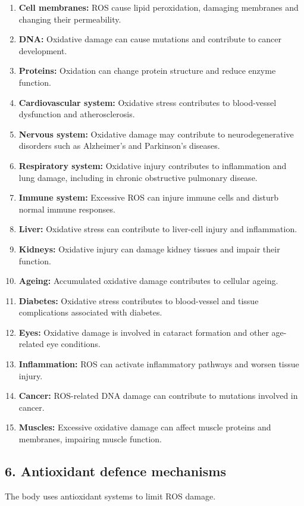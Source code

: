 \documentclass[11pt]{article}
\begin{document}
\begin{enumerate}
    \item \textbf{Cell membranes:} ROS cause lipid peroxidation, damaging membranes and changing their permeability.
    \item \textbf{DNA:} Oxidative damage can cause mutations and contribute to cancer development.
    \item \textbf{Proteins:} Oxidation can change protein structure and reduce enzyme function.
    \item \textbf{Cardiovascular system:} Oxidative stress contributes to blood-vessel dysfunction and atherosclerosis.
    \item \textbf{Nervous system:} Oxidative damage may contribute to neurodegenerative disorders such as Alzheimer's and Parkinson's diseases.
    \item \textbf{Respiratory system:} Oxidative injury contributes to inflammation and lung damage, including in chronic obstructive pulmonary disease.
    \item \textbf{Immune system:} Excessive ROS can injure immune cells and disturb normal immune responses.
    \item \textbf{Liver:} Oxidative stress can contribute to liver-cell injury and inflammation.
    \item \textbf{Kidneys:} Oxidative injury can damage kidney tissues and impair their function.
    \item \textbf{Ageing:} Accumulated oxidative damage contributes to cellular ageing.
    \item \textbf{Diabetes:} Oxidative stress contributes to blood-vessel and tissue complications associated with diabetes.
    \item \textbf{Eyes:} Oxidative damage is involved in cataract formation and other age-related eye conditions.
    \item \textbf{Inflammation:} ROS can activate inflammatory pathways and worsen tissue injury.
    \item \textbf{Cancer:} ROS-related DNA damage can contribute to mutations involved in cancer.
    \item \textbf{Muscles:} Excessive oxidative damage can affect muscle proteins and membranes, impairing muscle function.
\end{enumerate}

\subsection*{6. Antioxidant defence mechanisms}
The body uses antioxidant systems to limit ROS damage.
\end{document}
